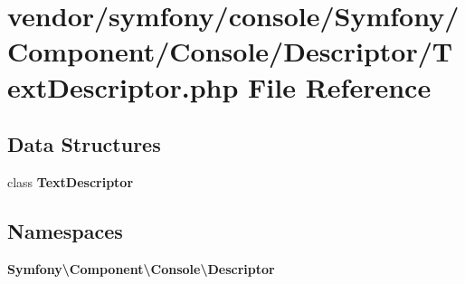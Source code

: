 \section{vendor/symfony/console/\+Symfony/\+Component/\+Console/\+Descriptor/\+Text\+Descriptor.php File Reference}
\label{_text_descriptor_8php}
\subsection*{Data Structures}
\begin{DoxyCompactItemize}
\item 
class {\bf Text\+Descriptor}
\end{DoxyCompactItemize}
\subsection*{Namespaces}
\begin{DoxyCompactItemize}
\item 
 {\bf Symfony\textbackslash{}\+Component\textbackslash{}\+Console\textbackslash{}\+Descriptor}
\end{DoxyCompactItemize}
